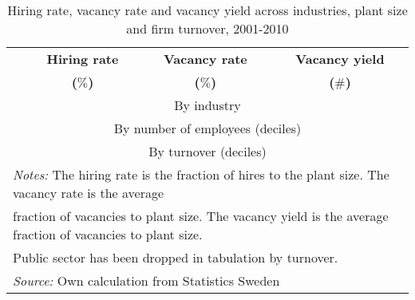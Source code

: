       \begin{table}[htbp]\centering
      \caption{\label{tab:vacancy_yield} Hiring rate, vacancy rate and vacancy yield across industries, plant size and firm turnover, 2001-2010
      \textbf{} }\begin{tabularx} {\textwidth} {  l  c  c  c} \\ \hline %
      \textbf{ } & \textbf{ Hiring rate } & \textbf{ Vacancy rate } & \textbf{  Vacancy yield  } \\
			\textbf{ } & \textbf{  ($\%$) } & \textbf{ ($\%$) } & \textbf{ ($\#$) } \\
      \midrule
			    \multicolumn{4}{c}{By industry} \\
			\midrule

     \midrule
						   \multicolumn{4}{c}{By number of employees (deciles)} \\
			\midrule

     \midrule
						  \multicolumn{4}{c}{By turnover (deciles)} \\
			\midrule

				\hline
      \multicolumn{4}{l}{\footnotesize{\emph{Notes:} The hiring rate is the fraction of hires to the plant size. The vacancy rate is the average }} \\
			\multicolumn{4}{l}{\footnotesize{fraction of vacancies to plant size. The vacancy yield is the average fraction of vacancies to plant size. } } \\
			\multicolumn{4}{l}{\footnotesize{Public sector has been dropped in tabulation by turnover.} } \\
      \multicolumn{4}{l}{\footnotesize{\emph{Source:} Own calculation from Statistics Sweden } }

      \end{tabularx}
      \end{table}
